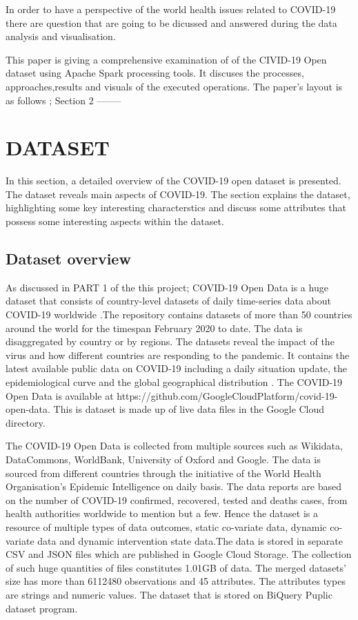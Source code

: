 \documentclass[12pt]{article}
\begin{document}
 In order to  have a perspective of the world health issues related to COVID-19 there are question that are going to be dicussed and answered during the data analysis and visualisation.
 
 This paper is giving a comprehensive examination of of the CIVID-19 Open dataset using Apache Spark processing tools. It discuses the processes, approaches,results and visuals of the executed operations. The paper's layout is as follows ; Section 2 --------

\section{DATASET}
 In this  section, a detailed overview of the COVID-19 open dataset is presented. The dataset reveals main aspects of COVID-19. The section explains the dataset, highlighting some key interesting characterstics and discuss some attributes that possess some interesting aspects  within the dataset.

\subsection{Dataset overview}

 As discussed in PART 1 of the this project;  COVID-19 Open Data is a huge dataset that consists of country-level datasets of daily time-series data about COVID-19 worldwide \cite{covid-19}.The repository contains datasets of more than 50 countries around the world for the timespan February 2020 to date. The data is disaggregated  by country or by regions. The datasets reveal the impact of the virus and how different countries are responding to the pandemic.  It contains the latest available public data on COVID-19 including a daily situation update, the epidemiological curve and the global geographical distribution \cite{covid-19}. The COVID-19 Open Data is available at https://github.com/GoogleCloudPlatform/covid-19-open-data. This is dataset is made up of live data files in the Google Cloud directory.

The COVID-19 Open Data is collected from multiple sources such as Wikidata, DataCommons, WorldBank, University of Oxford and Google. The data is sourced from different countries through the initiative of the World Health Organisation's Epidemic Intelligence on daily basis. The data reports are based on the number of COVID-19  confirmed, recovered, tested and deaths cases, from health authorities worldwide to mention but a few. Hence the dataset is a resource of multiple types of data outcomes, static co-variate data, dynamic co-variate data and dynamic intervention state data\cite{covid-19}.The data is stored in separate CSV and JSON files which are published in Google Cloud Storage. The collection of such huge quantities of files constitutes 1.01GB of data.  The merged datasets' size has  more than 6112480 observations and 45 attributes.  The attributes types are strings and numeric values. The dataset that is stored on BiQuery Puplic dataset program.
\end{document}
